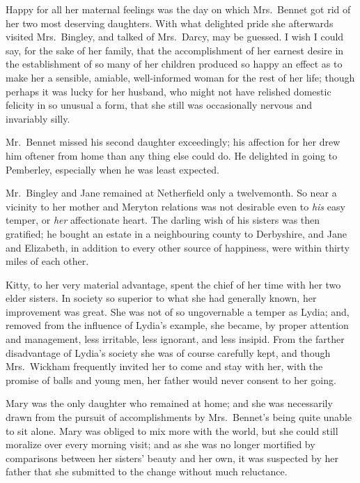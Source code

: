 \documentclass[12pt,english]{book}
\begin{document}

Happy for all her maternal feelings was the day on which Mrs.\ Bennet
got rid of her two most deserving daughters. With what delighted pride
she afterwards visited Mrs.\ Bingley, and talked of Mrs.\ Darcy,
may be guessed. I wish I could say, for the sake of her family, that
the accomplishment of her earnest desire in the establishment of so
many of her children produced so happy an effect as to make her a
sensible, amiable, well-informed woman for the rest of her life; though
perhaps it was lucky for her husband, who might not have relished
domestic felicity in so unusual a form, that she still was occasionally
nervous and invariably silly.

Mr.\ Bennet missed his second daughter exceedingly; his affection
for her drew him oftener from home than any thing else could do. He
delighted in going to Pemberley, especially when he was least expected.

Mr.\ Bingley and Jane remained at Netherfield only a twelvemonth.
So near a vicinity to her mother and Meryton relations was not desirable
even to \textit{his} easy temper, or \textit{her} affectionate heart.
The darling wish of his sisters was then gratified; he bought an estate
in a neighbouring county to Derbyshire, and Jane and Elizabeth, in
addition to every other source of happiness, were within thirty miles
of each other.

Kitty, to her very material advantage, spent the chief of her time
with her two elder sisters. In society so superior to what she had
generally known, her improvement was great. She was not of so ungovernable
a temper as Lydia; and, removed from the influence of Lydia's example,
she became, by proper attention and management, less irritable, less
ignorant, and less insipid. From the farther disadvantage of Lydia's
society she was of course carefully kept, and though Mrs.\ Wickham
frequently invited her to come and stay with her, with the promise
of balls and young men, her father would never consent to her going.

Mary was the only daughter who remained at home; and she was necessarily
drawn from the pursuit of accomplishments by Mrs.\ Bennet's being
quite unable to sit alone. Mary was obliged to mix more with the world,
but she could still moralize over every morning visit; and as she
was no longer mortified by comparisons between her sisters' beauty
and her own, it was suspected by her father that she submitted to
the change without much reluctance.
\end{document}
